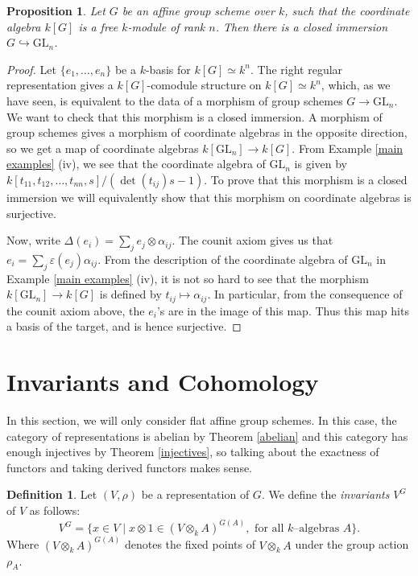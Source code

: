 \documentclass{article}
\theoremstyle{plain}
\newtheorem{Prop}[Th]{Proposition}
\theoremstyle{definition}
\newtheorem{Def}[Th]{Definition}
\newcommand{\GL}{\mathrm{GL}}
\begin{document}
\begin{Prop}\label{Thm: Group schemes over fields are embedding in GL_n}
     Let $G$ be an affine group scheme over $k$, such that the coordinate algebra $k[G]$ is a free $k$-module of rank $n$. Then there is a closed immersion $G\hookrightarrow \GL_n$.
 \end{Prop}


 \begin{proof}
Let $\{e_1, \dots , e_n\}$ be a $k$-basis for $k[G]\simeq k^n$. The right regular representation gives a $k[G]$-comodule structure on $k[G]\simeq k^n$, which, as we have seen, is equivalent to the data of a morphism of group schemes $G\to \GL_n$. We want to check that this morphism is a closed immersion. A morphism of group schemes gives a morphism of coordinate algebras in the opposite direction, so we get a map of coordinate algebras $k[\GL_n]\to k[G]$. From Example \ref{main examples} (iv), we see that the coordinate algebra of $\GL_n$ is given by $k[t_{11}, t_{12}, \dots, t_{nn}, s]/(\det(t_{ij})s-1)$. To prove that this morphism is a closed immersion we will equivalently show that this morphism on coordinate algebras is surjective.

Now, write $\Delta(e_i)=\sum_j e_j\otimes\alpha_{ij}$. The counit axiom gives us that $e_i=\sum_j \varepsilon(e_j)\alpha_{ij}$. From the description of the coordinate algebra of $\GL_n$ in Example \ref{main examples} (iv), it is not so hard to see that the morphism $k[\GL_n]\to k[G]$ is defined by $t_{ij}\mapsto \alpha_{ij}$. In particular, from the consequence of the counit axiom above, the $e_i$'s are in the image of this map. Thus this map hits a basis of the target, and is hence surjective.
 \end{proof}
  

\pagebreak
\section{Invariants and Cohomology}

In this section, we will only consider flat affine group schemes. In this case, the category of representations is abelian by Theorem \ref{abelian} and this category has enough injectives by Theorem \ref{injectives}, so talking about the exactness of functors and taking derived functors makes sense. 

\begin{Def}
    Let $(V, \rho)$ be a representation of $G$. We define the \textit{invariants} $V^G$ of $V$ as follows:
\[
V^G=\{x\in V \mid x\otimes 1\in (V\otimes_k A)^{G(A)}, \text{ for all $k$--algebras $A$}\}.
\]
Where $(V\otimes_k A)^{G(A)}$ denotes the fixed points of $V\otimes_k A$ under the group action $\rho_A$.
\end{Def}
\end{document}
